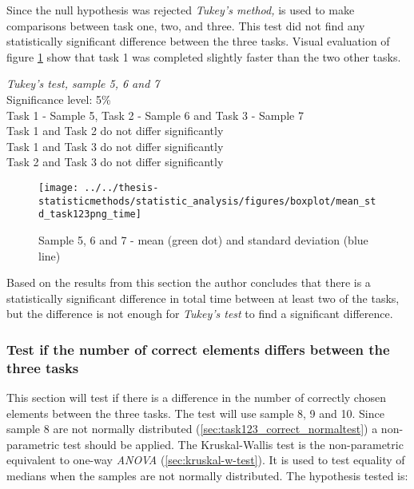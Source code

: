 Since the null hypothesis was rejected \textit{Tukey's method,} is used to make comparisons between task one, two, and three. This test did not find any statistically significant difference between the three tasks. Visual evaluation of figure \ref{fig:meanstdtask123pngtime} show that task 1 was completed slightly faster than the two other tasks. 

 \begin{center}
	\begin{tcolorbox}[width=0.8\textwidth]
		\centering
		\textit{Tukey's test, sample 5, 6 and 7}\\
		Significance level: 5\%  \\[0.5cm]
		Task 1 - Sample 5, Task 2 - Sample 6 and Task 3 - Sample 7 \\[0.5cm]
		
		Task 1 and Task 2 do not differ significantly \\
		Task 1 and Task 3 do not differ significantly \\
		Task 2 and Task 3 do not differ significantly \\[0.2cm]
	\end{tcolorbox} 
\end{center}

\begin{figure}[h!]
	\centering
	\texttt{[image: ../../thesis-statisticmethods/statistic\_analysis/figures/boxplot/mean\_std\_task123png\_time]}
	\caption{Sample 5, 6 and 7 - mean (green dot) and standard deviation (blue line)}
	\label{fig:meanstdtask123pngtime}
\end{figure}

\vspace{0.3cm}
Based on the results from this section the author concludes that there is a statistically significant difference in total time between at least two of the tasks, but the difference is not enough for \textit{Tukey's test} to find a significant difference. 

\subsubsection[Sample 8, 9, and 10]{Test if the number of correct elements differs between the three tasks}\label{sec:sample_8_9_10_kruskal)} %
This section will test if there is a difference in the number of correctly chosen elements between the three tasks. The test will use sample 8, 9 and 10. Since sample 8 are not normally distributed (\ref{sec:task123_correct_normaltest}) a non-parametric test should be applied. The Kruskal-Wallis test is the non-parametric equivalent to one-way \textit{ANOVA} (\ref{sec:kruskal-w-test}). It is used to test equality of medians when the samples are not normally distributed. The hypothesis tested is: \\[0.2cm]

